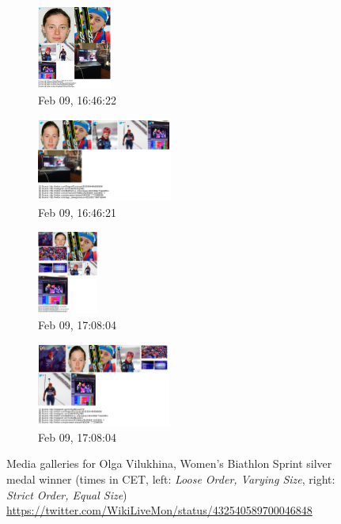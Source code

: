 \documentclass{sig-alternate}
\newcommand{\inlinelistingsize}{\fontsize{8pt}{11pt}}
\let\oldurl\url
\renewcommand{\url}[1]{\inlinelistingsize\oldurl{#1}}
\begin{document}
\begin{figure}[p!]
\begin{subfigure}[t]{0.25\textwidth}
    \includegraphics[height=2.75cm]{figures/olga_vilukhina/mediagallery_looseOrder_1391960782060.png}
    \caption{Feb 09, 16:46:22}
    \label{fig:1391960782060}
  \end{subfigure}%
  \begin{subfigure}[t]{0.25\textwidth}
    \includegraphics[height=2.75cm]{figures/olga_vilukhina/mediagallery_strictOrder_1391960781898.png}
    \caption{Feb 09, 16:46:21}
    \label{fig:1391960781898}
  \end{subfigure}
  \begin{subfigure}[t]{0.25\textwidth}
    \includegraphics[height=2.75cm]{figures/olga_vilukhina/mediagallery_looseOrder_1391962084554.png}
    \caption{Feb 09, 17:08:04}
    \label{fig:1391962084554}
  \end{subfigure}%
  \begin{subfigure}[t]{0.25\textwidth}
    \includegraphics[height=2.75cm]{figures/olga_vilukhina/mediagallery_strictOrder_1391962084361.png}
    \caption{Feb 09, 17:08:04}
    \label{fig:1391962084361}
  \end{subfigure}  
  \caption{Media galleries for Olga Vilukhina,
    Women's Biathlon Sprint silver medal winner
    (times in CET, left: \emph{Loose Order, Varying Size},
    right: \emph{Strict Order, Equal Size})
    \url{https://twitter.com/WikiLiveMon/status/432540589700046848}}
  \label{fig:olga-vilukhina}
\end{figure}
\end{document}
